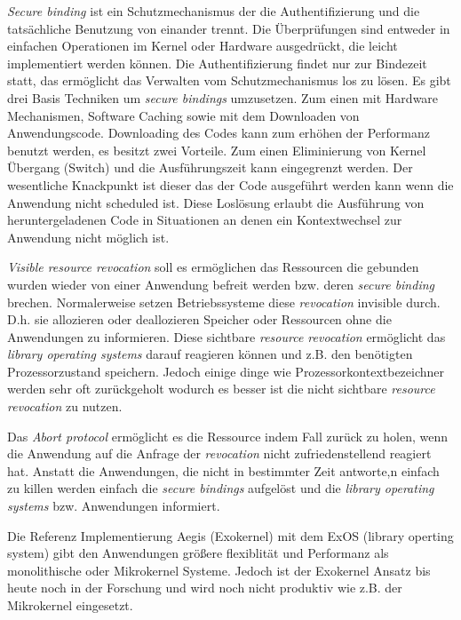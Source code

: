 \documentclass[german, 9pt,technote]{IEEEtran}
\begin{document}
      \textit{Secure binding} ist ein Schutzmechanismus der die Authentifizierung und die tats\"achliche Benutzung von einander trennt.
      Die \"Uberpr\"ufungen sind entweder in einfachen Operationen im Kernel oder Hardware ausgedr\"uckt, die leicht implementiert werden k\"onnen.
      Die Authentifizierung findet nur zur Bindezeit statt, das erm\"oglicht das Verwalten vom Schutzmechanismus los zu l\"osen. Es gibt drei Basis Techniken
      um \textit{secure bindings} umzusetzen. Zum einen mit Hardware Mechanismen, Software Caching sowie mit dem Downloaden von Anwendungscode.
      Downloading des Codes kann zum erh\"ohen der Performanz benutzt werden, es besitzt zwei Vorteile. Zum einen Eliminierung von Kernel \"Ubergang (Switch)
      und die Ausf\"uhrungszeit kann eingegrenzt werden. Der wesentliche Knackpunkt ist dieser das der Code ausgef\"uhrt werden kann wenn die Anwendung nicht
      scheduled ist. Diese Losl\"osung erlaubt die Ausf\"uhrung von heruntergeladenen Code in Situationen an denen ein Kontextwechsel zur
      Anwendung nicht m\"oglich ist.
        
      \textit{Visible resource revocation} soll es erm\"oglichen das Ressourcen die gebunden wurden wieder von einer Anwendung befreit werden  
      bzw. deren \textit{secure binding} brechen. Normalerweise setzen Betriebssysteme diese \textit{revocation} invisible durch. 
      D.h. sie allozieren oder deallozieren Speicher oder Ressourcen ohne die Anwendungen zu informieren.
      Diese sichtbare \textit{resource revocation} erm\"oglicht das \textit{library operating systems} darauf reagieren k\"onnen und
      z.B. den ben\"otigten Prozessorzustand speichern. Jedoch einige dinge wie Prozessorkontextbezeichner werden sehr oft zur\"uckgeholt wodurch
      es besser ist die nicht sichtbare \textit{resource revocation} zu nutzen.
        
      Das \textit{Abort protocol} erm\"oglicht es die Ressource indem Fall zur\"uck zu holen, wenn die Anwendung auf die
      Anfrage der \textit{revocation} nicht zufriedenstellend reagiert hat.
      Anstatt die Anwendungen, die nicht in bestimmter Zeit antworte,n einfach zu killen werden einfach die
      \textit{secure bindings} aufgel\"ost und die \textit{library operating systems} bzw. Anwendungen informiert.
        
      Die Referenz Implementierung Aegis (Exokernel) mit dem ExOS (library operting system) gibt den Anwendungen gr\"o\ss ere flexiblit\"at 
      und Performanz als monolithische oder Mikrokernel Systeme. Jedoch ist der Exokernel Ansatz bis heute noch in der Forschung und wird
      noch nicht produktiv wie z.B. der Mikrokernel eingesetzt.
        
\end{document}

